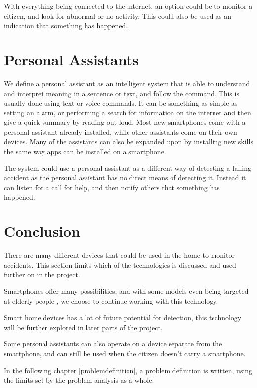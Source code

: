 With everything being connected to the internet, an option could be to monitor a citizen, and look for abnormal or no activity. This could also be used as an indication that something has happened.

\section{Personal Assistants}
We define a personal assistant as an intelligent system that is able to understand and interpret meaning in a sentence or text, and follow the command. This is usually done using text or voice commands. It can be something as simple as setting an alarm, or performing a search for information on the internet and then give a quick summary by reading out loud. Most new smartphones come with a personal assistant already installed, while other assistants come on their own devices. Many of the assistants can also be expanded upon by installing new skills the same way apps can be installed on a smartphone.

The system could use a personal assistant as a different way of detecting a falling accident as the personal assistant has no direct means of detecting it. Instead it can listen for a call for help, and then notify others that something has happened.

\section{Conclusion}
There are many different devices that could be used in the home to monitor accidents. This section limits which of the technologies is discussed and used further on in the project.

Smartphones offer many possibilities, and with some models even being targeted at elderly people \cite{doro}, we choose to continue working with this technology.

Smart home devices has a lot of future potential for detection, this technology will be further explored in later parts of the project.

Some personal assistants can also operate on a device separate from the smartphone, and can still be used when the citizen doesn't carry a smartphone.

In the following chapter \ref{problemdefinition}, a problem definition is written, using the limits set by the problem analysis as a whole.
